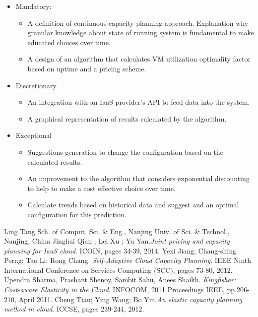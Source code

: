 \documentclass[11pt]{artikel3}
\begin{document}
\begin{itemize}
\item Mandatory:
\begin{itemize}
\item A definition of continuous capacity planning approach. Explanation why granular knowledge about state of running system is fundamental to make educated choices over time. 
\item A design of an algorithm that calculates VM utilization optimality factor based on uptime and a pricing scheme.
\end{itemize}

\item Discretionary
\begin{itemize}
\item An integration with an IaaS provider's API to feed data into the system.
\item A graphical representation of results calculated by the algorithm.
\end{itemize}

\item Exceptional
\begin{itemize}
\item Suggestions generation to change the configuration based on the calculated results.
\item An improvement to the algorithm that considers exponential discounting to help to make a cost effective choice over time.
\item Calculate trends based on historical data and suggest and an optimal configuration for this prediction.
\end{itemize}
\end{itemize}

\begin{thebibliography}{50}
 Ling Tang Sch. of Comput. Sci. \& Eng., Nanjing Univ. of Sci. \& Technol., Nanjing, China Jinghui Qian ; Lei Xu ; Yu Yan.\textsl{Joint pricing and capacity planning for IaaS cloud}. ICOIN, pages 34-39, 2014.
  Yexi Jiang; Chang-shing Perng; Tao Li; Rong Chang. \textsl{Self-Adaptive Cloud Capacity Planning}. IEEE Ninth International Conference on Services Computing (SCC), pages 73-80, 2012.
 Upendra Sharma, Prashant Shenoy, Sambit Sahu, Anees Shaikh. \textsl{Kingfisher: Cost-aware Elasticity in the Cloud}. INFOCOM, 2011 Proceedings IEEE, pp.206-210, April 2011.
 Cheng Tian; Ying Wang; Bo Yin.\textsl{An elastic capacity planning method in cloud}. ICCSE, pages 239-244, 2012.
\end{thebibliography}
\end{document}
